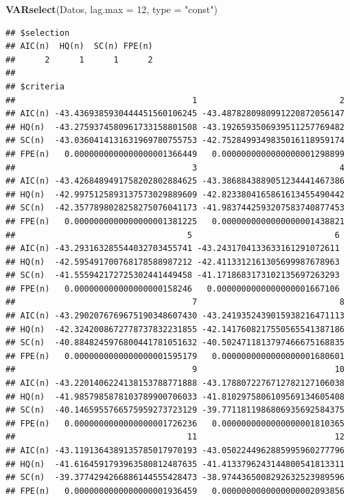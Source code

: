 \documentclass[
]{book}
\newenvironment{Shaded}{\begin{snugshade}}{\end{snugshade}}
\newcommand{\AttributeTok}[1]{\textcolor[rgb]{0.13,0.29,0.53}{#1}}
\newcommand{\DecValTok}[1]{\textcolor[rgb]{0.00,0.00,0.81}{#1}}
\newcommand{\FunctionTok}[1]{\textcolor[rgb]{0.13,0.29,0.53}{\textbf{#1}}}
\newcommand{\NormalTok}[1]{#1}
\newcommand{\StringTok}[1]{\textcolor[rgb]{0.31,0.60,0.02}{#1}}
\begin{document}
\begin{Shaded}
\begin{Highlighting}[]
\FunctionTok{VARselect}\NormalTok{(Datos, }\AttributeTok{lag.max =} \DecValTok{12}\NormalTok{, }\AttributeTok{type =} \StringTok{"const"}\NormalTok{)}
\end{Highlighting}
\end{Shaded}

\begin{verbatim}
## $selection
## AIC(n)  HQ(n)  SC(n) FPE(n) 
##      2      1      1      2 
## 
## $criteria
##                                    1                             2
## AIC(n) -43.4369385930444451560106245 -43.4878280980991220872056147
## HQ(n)  -43.2759374580961733158801508 -43.1926593506939511257769482
## SC(n)  -43.0360414131631969780755753 -42.7528499349835016118959174
## FPE(n)   0.0000000000000000001366449   0.0000000000000000001298899
##                                    3                             4
## AIC(n) -43.4268489491758202802884625 -43.3868843889051234441467386
## HQ(n)  -42.9975125893137573029889609 -42.8233804165861613455490442
## SC(n)  -42.3577898028258275076041173 -41.9837442593207583740877453
## FPE(n)   0.0000000000000000001381225   0.0000000000000000001438821
##                                   5                             6
## AIC(n) -43.293163285544032703455741 -43.2431704133633161291072611
## HQ(n)  -42.595491700768178588987212 -42.4113312161305699987678963
## SC(n)  -41.555942172725302441449458 -41.1718683173102135697263293
## FPE(n)   0.000000000000000000158246   0.0000000000000000001667106
##                                    7                             8
## AIC(n) -43.2902076769675190348607430 -43.2419352439015938216471113
## HQ(n)  -42.3242008672778737832231855 -42.1417608217550565541387186
## SC(n)  -40.8848245976800441781051632 -40.5024711813797466675168835
## FPE(n)   0.0000000000000000001595179   0.0000000000000000001680601
##                                    9                            10
## AIC(n) -43.2201406224138153788771888 -43.1788072276712782127106038
## HQ(n)  -41.9857985878103789900706033 -41.8102975806109569134605408
## SC(n)  -40.1465955766575959273723129 -39.7711811986806935692584375
## FPE(n)   0.0000000000000000001726236   0.0000000000000000001810365
##                                   11                            12
## AIC(n) -43.1191364389135785017970193 -43.0502244962885995960277796
## HQ(n)  -41.6164591793963580812487635 -41.4133796243144800541813311
## SC(n)  -39.3774294266886144555428473 -38.9744365008292632523989596
## FPE(n)   0.0000000000000000001936459   0.0000000000000000002093856
\end{verbatim}
\end{document}
